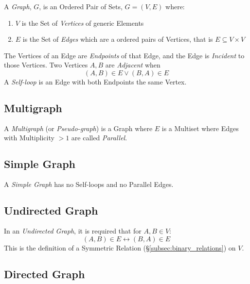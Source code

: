 \documentclass{article}
\begin{document}
A \emph{Graph}, $G$, is an Ordered Pair of Sets, $G = (V,E)$ where:
\begin{enumerate}
\item $V$ is the Set of \emph{Vertices} of generic Elements
\item $E$ is the Set of \emph{Edges} which are a ordered pairs of
  Vertices, that is $E \subseteq V \times V$
\end{enumerate}
The Vertices of an Edge are \emph{Endpoints} of that Edge, and the
Edge is \emph{Incident} to those Vertices. Two Vertices $A,B$ are
\emph{Adjacent} when
\[
    (A,B) \in E \vee (B,A) \in E
\]
A \emph{Self-loop} is an Edge with both Endpoints the same Vertex.

\subsection{Multigraph} \label{subsec:multigraph}

A \emph{Multigraph} (or \emph{Pseudo-graph}) is a Graph where $E$ is a
Multiset where Edges with Multiplicity $>1$ are called
\emph{Parallel}.

\subsection{Simple Graph} \label{subsec:simple_graph}

A \emph{Simple Graph} has no Self-loops and no Parallel Edges.

\subsection{Undirected Graph} \label{subsec:undirected_graph}

In an \emph{Undirected Graph}, it is required that for $A,B \in V$:
\[
    (A,B) \in E \leftrightarrow (B,A) \in E
\]
This is the definition of a Symmetric Relation
(\S\ref{subsec:binary_relations}) on $V$.

\subsection{Directed Graph} \label{subsec:directed_graph}
\end{document}
